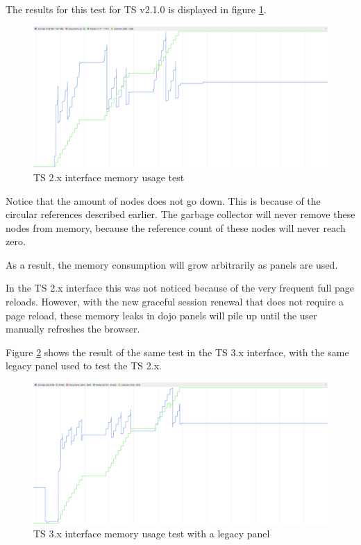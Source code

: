 The results for this test for TS v2.1.0 is displayed in figure \ref{fig:ts2_memory}.
\begin{figure}
  \centering
  \includegraphics[width=\textwidth]{images/dinosaurs-are-great-120s-run}
  \caption{TS 2.x interface memory usage test}
  \label{fig:ts2_memory}
\end{figure}
Notice that the amount of nodes does not go down. This is because of the circular
references described earlier. The garbage collector will never remove these nodes
from memory, because the reference count of these nodes will never reach zero.

As a result, the memory consumption will grow arbitrarily as panels are used.

In the TS 2.x interface this was not noticed because of the very frequent full
page reloads.
However, with the new graceful session renewal that does not require a page
reload, these memory leaks in dojo panels will pile up until the user manually
refreshes the browser.

Figure \ref{fig:ts3_legacy_memory} shows the result of the same test in the
TS 3.x interface, with the same legacy panel used to test the TS 2.x.
\begin{figure}
  \centering
  \includegraphics[width=\textwidth]{images/kill-all-roommates-120s-run}
  \caption{TS 3.x interface memory usage test with a legacy panel}
  \label{fig:ts3_legacy_memory}
\end{figure}

